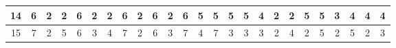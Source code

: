 \begin{sidewaystable}[]
\begin{tabular}{|c|c|c|c|c|c|c|c|c|c|c|c|c|c|c|c|c|c|c|c|c|c|c|c|c|}
    14      & 6                                               & 2                                               & 2                                               & 6                                               & 2                                               & 2                                               & 6                                               & 2                                               & 6                                               & 2                                                & 6                                                & 5                                                 &    5                                               & 5                                               & 5                                               & 4                                               & 2                                               & 2                                               & 5                                               & 5                                               & 3                                               & 4                                                & 4                                                & 4                                                \\ \hline
    15      & 7                                               & 2                                               & 5                                               & 6                                               & 3                                               & 4                                               & 7                                               & 2                                               & 6                                               & 3                                                & 7                                                & 4                                                 &    7                                               & 3                                               & 3                                               & 3                                               & 2                                               & 4                                               & 2                                               & 5                                               & 2                                               & 5                                                & 2                                                & 3                                                \\ \hline

\end{tabular}
\end{sidewaystable}
